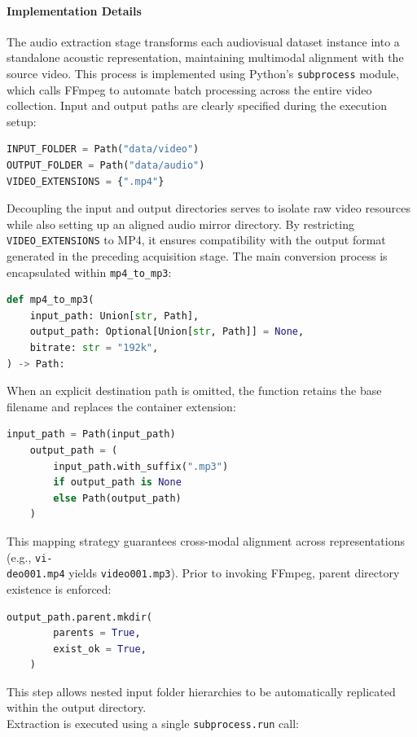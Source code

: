 \paragraph{Implementation Details}
The audio extraction stage transforms each audiovisual dataset instance into a standalone acoustic representation, maintaining multimodal alignment with the source video. This process is implemented using Python's \texttt{subprocess} module, which calls FFmpeg to automate batch processing across the entire video collection. Input and output paths are clearly specified during the execution setup:
\begin{lstlisting}[language=Python, xleftmargin=2em]
INPUT_FOLDER = Path("data/video")
OUTPUT_FOLDER = Path("data/audio")
VIDEO_EXTENSIONS = {".mp4"}
\end{lstlisting}
Decoupling the input and output directories serves to isolate raw video resources while also setting up an aligned audio mirror directory. By restricting \texttt{VIDEO\_EXTENSIONS} to MP4, it ensures compatibility with the output format generated in the preceding acquisition stage. The main conversion process is encapsulated within \texttt{mp4\_to\_mp3}:\\
\begin{lstlisting}[language=Python, xleftmargin=2em]
def mp4_to_mp3(
    input_path: Union[str, Path],
    output_path: Optional[Union[str, Path]] = None,
    bitrate: str = "192k",
) -> Path:
\end{lstlisting}
When an explicit destination path is omitted, the function retains the base filename and replaces the container extension:
\begin{lstlisting}[language=Python, xleftmargin=2em]
    input_path = Path(input_path)
    output_path = (
        input_path.with_suffix(".mp3")
        if output_path is None
        else Path(output_path)
    )
\end{lstlisting}
This mapping strategy guarantees cross-modal alignment across representations (e.g., \texttt{vi-\\deo001.mp4} yields \texttt{video001.mp3}).
Prior to invoking FFmpeg, parent directory existence is enforced:
\begin{lstlisting}[language=Python, xleftmargin=2em]
    output_path.parent.mkdir(
        parents = True,
        exist_ok = True,
    )
\end{lstlisting}
This step allows nested input folder hierarchies to be automatically replicated within the output directory.
\\Extraction is executed using a single \texttt{subprocess.run} call:
